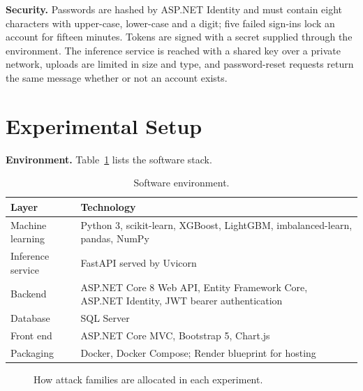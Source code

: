 \documentclass[conference]{IEEEtran}
\begin{document}
\textbf{Security.} Passwords are hashed by ASP.NET Identity and must contain eight characters with upper-case, lower-case and a digit; five failed sign-ins lock an account for fifteen minutes. Tokens are signed with a secret supplied through the environment. The inference service is reached with a shared key over a private network, uploads are limited in size and type, and password-reset requests return the same message whether or not an account exists.

\section{Experimental Setup}
\textbf{Environment.} Table~\ref{tab:env} lists the software stack.

\begin{table}[!htb]
\caption{Software environment.}
\label{tab:env}
\centering\footnotesize
\begin{tabular}{@{}p{2.2cm}p{5.1cm}@{}}
\hline
Layer & Technology \\
\hline
Machine learning & Python 3, scikit-learn, XGBoost, LightGBM, imbalanced-learn, pandas, NumPy \\
Inference service & FastAPI served by Uvicorn \\
Backend & ASP.NET Core 8 Web API, Entity Framework Core, ASP.NET Identity, JWT bearer authentication \\
Database & SQL Server \\
Front end & ASP.NET Core MVC, Bootstrap 5, Chart.js \\
Packaging & Docker, Docker Compose; Render blueprint for hosting \\
\hline
\end{tabular}
\end{table}

\begin{figure}[!htb]
\centering
{}
\caption{How attack families are allocated in each experiment.}
\label{fig:proto}
\end{figure}
\end{document}
